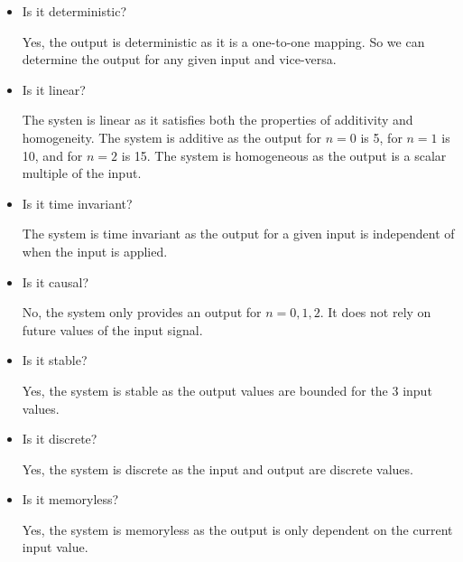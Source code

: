 \documentclass{article}
\begin{document}
\begin{itemize}
    \item Is it deterministic? 
    
    Yes, the output is deterministic as it is a one-to-one mapping. So we can determine the output for any given input and vice-versa.

    \item Is it linear?
    
    The systen is linear as it satisfies both the properties of additivity and homogeneity. The system is additive as the output for $n = 0$ is 5, for $n = 1$ is 10, and for $n = 2$ is 15. The system is homogeneous as the output is a scalar multiple of the input.

    \item Is it time invariant?
    
    The system is time invariant as the output for a given input is independent of when the input is applied. 

    \item Is it causal?

    No, the system only provides an output for $n = 0, 1, 2$. It does not rely on future values of the input signal.

    \item Is it stable?

    Yes, the system is stable as the output values are bounded for the 3 input values.

    \item Is it discrete?

    Yes, the system is discrete as the input and output are discrete values.

    \item Is it memoryless?

    Yes, the system is memoryless as the output is only dependent on the current input value.
\end{itemize}

\end{document}
